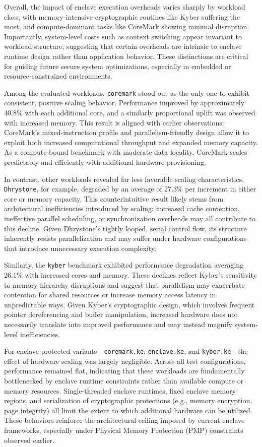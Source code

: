 Overall, the impact of enclave execution overheads varies sharply by workload class, with memory-intensive cryptographic routines like Kyber suffering the most, and compute-dominant tasks like CoreMark showing minimal disruption. Importantly, system-level costs such as context switching appear invariant to workload structure, suggesting that certain overheads are intrinsic to enclave runtime design rather than application behavior. These distinctions are critical for guiding future secure system optimizations, especially in embedded or resource-constrained environments.    

Among the evaluated workloads, \texttt{coremark} stood out as the only one to exhibit consistent, positive scaling behavior. Performance improved by approximately 40.8\% with each additional core, and a similarly proportional uplift was observed with increased memory. This result is aligned with earlier observations: CoreMark’s mixed-instruction profile and parallelism-friendly design allow it to exploit both increased computational throughput and expanded memory capacity. As a compute-bound benchmark with moderate data locality, CoreMark scales predictably and efficiently with additional hardware provisioning.

In contrast, other workloads revealed far less favorable scaling characteristics. \texttt{Dhrystone}, for example, degraded by an average of 27.3\% per increment in either core or memory capacity. This counterintuitive result likely stems from architectural inefficiencies introduced by scaling: increased cache contention, ineffective parallel scheduling, or synchronization overheads may all contribute to this decline. Given Dhrystone’s tightly looped, serial control flow, its structure inherently resists parallelization and may suffer under hardware configurations that introduce unnecessary execution complexity.

Similarly, the \texttt{kyber} benchmark exhibited performance degradation averaging 26.1\% with increased cores and memory. These declines reflect Kyber’s sensitivity to memory hierarchy disruptions and suggest that parallelism may exacerbate contention for shared resources or increase memory access latency in unpredictable ways. Given Kyber’s cryptographic design, which involves frequent pointer dereferencing and buffer manipulation, increased hardware does not necessarily translate into improved performance and may instead magnify system-level inefficiencies.

For enclave-protected variants—\texttt{coremark.ke}, \texttt{enclave.ke}, and \texttt{kyber.ke}—the effect of hardware scaling was largely negligible. Across all test configurations, performance remained flat, indicating that these workloads are fundamentally bottlenecked by enclave runtime constraints rather than available compute or memory resources. Single-threaded enclave runtimes, fixed enclave memory regions, and serialization of cryptographic protections (e.g., memory encryption, page integrity) all limit the extent to which additional hardware can be utilized. These behaviors reinforce the architectural ceiling imposed by current enclave frameworks, especially under Physical Memory Protection (PMP) constraints observed earlier.


